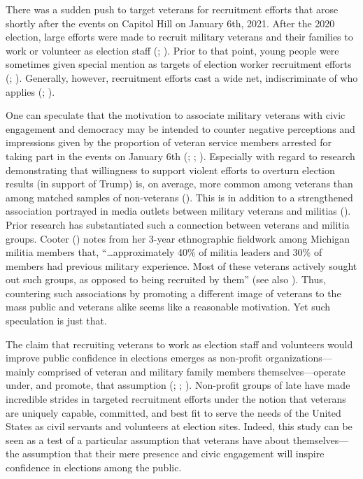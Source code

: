 \documentclass[
  12pt,
  letterpaper,
]{article}
\begin{document}
There was a sudden push to target veterans for recruitment efforts that
arose shortly after the events on Capitol Hill on January 6th, 2021.
After the 2020 election, large efforts were made to recruit military
veterans and their families to work or volunteer as election staff
(;
). Prior to that
point, young people were sometimes given special mention as targets of
election worker recruitment efforts (; ).
Generally, however, recruitment efforts cast a wide net, indiscriminate
of who applies (;
).

One can speculate that the motivation to associate military veterans
with civic engagement and democracy may be intended to counter negative
perceptions and impressions given by the proportion of veteran service
members arrested for taking part in the events on January 6th
(;
;
). Especially with
regard to research demonstrating that willingness to support violent
efforts to overturn election results (in support of Trump) is, on
average, more common among veterans than among matched samples of
non-veterans (). This is in
addition to a strengthened association portrayed in media outlets
between military veterans and militias
(). Prior research has
substantiated such a connection between veterans and militia groups.
Cooter () notes from her 3-year
ethnographic fieldwork among Michigan militia members that,
``\ldots approximately 40\% of militia leaders and 30\% of members had
previous military experience. Most of these veterans actively sought out
such groups, as opposed to being recruited by them'' (see also
). Thus, countering such
associations by promoting a different image of veterans to the mass
public and veterans alike seems like a reasonable motivation. Yet such
speculation is just that.

The claim that recruiting veterans to work as election staff and
volunteers would improve public confidence in elections emerges as
non-profit organizations---mainly comprised of veteran and military
family members themselves---operate under, and promote, that assumption
(;
;
). Non-profit groups of late
have made incredible strides in targeted recruitment efforts under the
notion that veterans are uniquely capable, committed, and best fit to
serve the needs of the United States as civil servants and volunteers at
election sites. Indeed, this study can be seen as a test of a particular
assumption that veterans have about themselves---the assumption that
their mere presence and civic engagement will inspire confidence in
elections among the public.
\end{document}

